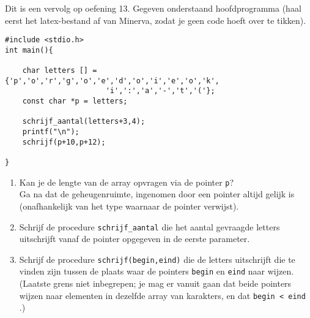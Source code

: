         
\beginoef
Dit is een vervolg op oefening 13. Gegeven onderstaand  hoofdprogramma (haal eerst het latex-bestand af van Minerva, zodat je geen code hoeft over te tikken). 
\begin{verbatim}
#include <stdio.h>
int main(){
	
    char letters [] = {'p','o','r','g','o','e','d','o','i','e','o','k',
                       'i',':','a','-','t','('};
    const char *p = letters; 

    schrijf_aantal(letters+3,4);
    printf("\n");
    schrijf(p+10,p+12);
    
} 
\end{verbatim} 

\begin{enumerate}
\item Kan je de lengte van de array opvragen via de pointer \verb{p{?
\\Ga na dat de geheugenruimte, ingenomen door een pointer altijd gelijk is (onafhankelijk van het type waarnaar de pointer verwijst).

\item Schrijf de procedure \verb}schrijf_aantal} die het aantal gevraagde letters uitschrijft vanaf de pointer opgegeven in de eerste parameter.

\item Schrijf de procedure \verb}schrijf(begin,eind)} die de letters uitschrijft die te vinden zijn tussen de plaats waar de pointers \verb}begin} en \verb}eind} naar wijzen. (Laatste grens niet inbegrepen; je mag er vanuit gaan dat beide pointers wijzen naar elementen in dezelfde array van karakters, en dat \verb}begin < eind} .)

\end{enumerate}
\endoef



	
